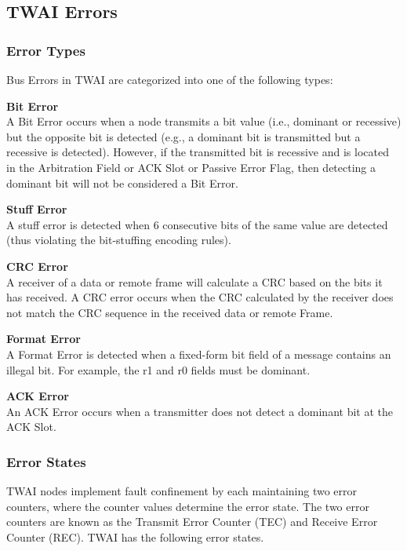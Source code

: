 \documentclass[main\_\_EN.tex]{subfiles}
\begin{document}


\subsection{TWAI Errors}
\label{sec:twai-errors}
\subsubsection{Error Types}

Bus Errors in TWAI are categorized into one of the following types:

{\bfseries Bit Error}\\
A Bit Error occurs when a node transmits a bit value (i.e., dominant or recessive) but the opposite bit is detected (e.g., a dominant bit is transmitted but a recessive is detected). However, if the transmitted bit is recessive and is located in the Arbitration Field or ACK Slot or Passive Error Flag, then detecting a dominant bit will not be considered a Bit Error.

{\bfseries Stuff Error}\\
A stuff error is detected when 6 consecutive bits of the same value are detected (thus violating the bit-stuffing encoding rules).

{\bfseries CRC Error}\\
A receiver of a data or remote frame will calculate a CRC based on the bits it has received. A CRC error occurs when the CRC calculated by the receiver does not match the CRC sequence in the received data or remote Frame.

{\bfseries Format Error}\\
A Format Error is detected when a fixed-form bit field of a message contains an illegal bit. For example, the r1 and r0 fields must be dominant.

{\bfseries ACK Error}\\
An ACK Error occurs when a transmitter does not detect a dominant bit at the ACK Slot.

\subsubsection{Error States}

TWAI nodes implement fault confinement by each maintaining two error counters, where the counter values determine the error state. The two error counters are known as the Transmit Error Counter (TEC) and Receive Error Counter (REC). TWAI has the following error states.
\end{document}

